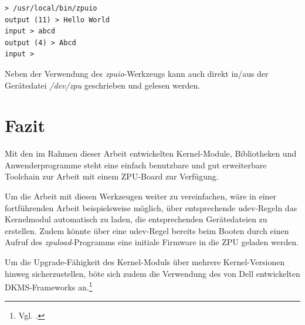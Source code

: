 \documentclass[11pt]{scrartcl}
\begin{document}
\begin{lstlisting}[caption=Verwendung des zpuio-Werkzeugs]
> /usr/local/bin/zpuio
output (11) > Hello World
input > abcd
output (4) > Abcd
input >
\end{lstlisting}

Neben der Verwendung des \emph{zpuio}-Werkzeugs kann auch direkt in/aus der Gerätedatei \emph{/dev/zpu} geschrieben und gelesen werden.

\pagebreak
\section{Fazit}

Mit den im Rahmen dieser Arbeit entwickelten Kernel-Module, Bibliotheken und Anwenderprogramme steht eine einfach benutzbare und gut erweiterbare Toolchain zur Arbeit mit einem ZPU-Board zur Verfügung.

Um die Arbeit mit diesen Werkzeugen weiter zu vereinfachen, wäre in einer fortführenden Arbeit beispielsweise möglich, über entsprechende udev-Regeln das Kernelmodul automatisch zu laden, die entsprechenden Gerätedateien zu erstellen. Zudem könnte über eine udev-Regel bereits beim Booten durch einen Aufruf des \textit{zpuload}-Programms eine initiale Firmware in die ZPU geladen werden.

Um die Upgrade-Fähigkeit des Kernel-Moduls über mehrere Kernel-Versionen hinweg sicherzustellen, böte sich zudem die Verwendung des von Dell entwickelten DKMS-Frameworks an.\footnote{Vgl. \cite{dkms-ljournal}.}

\pagebreak %

\fancyhead[R]{}

\thispagestyle{empty}

\renewcommand*{\biburlprefix}{(URL: }
\renewcommand*{\biburlsuffix}{)}

\pagebreak
{} %


\appendix
\end{document}
